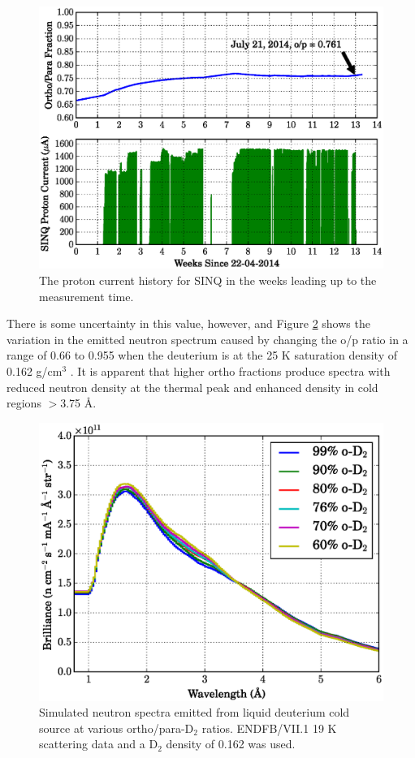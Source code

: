 \documentclass[5p,12pt]{elsarticle}
\begin{document}
\begin{figure}[h!] 
  \centering
    \includegraphics[width=\columnwidth]{graphics/p_current.eps}
     \caption{The proton current history for SINQ in the weeks leading up to the measurement time. \label{fig:p_current}}
\end{figure}

There is some uncertainty in this value, however, and Figure \ref{fig:op_compare} shows the variation in the emitted neutron spectrum caused by changing the o/p ratio in a range of 0.66 to 0.955 when the deuterium is at the 25 K saturation density of 0.162 g/cm$^3$ \cite{bnl_cryo}.  It is apparent that higher ortho fractions produce spectra with reduced neutron density at the thermal peak and enhanced density in cold regions $>$3.75 {\AA}.

\begin{figure}[h!] 
  \centering
    \includegraphics[width=\columnwidth]{graphics/op_compare.eps}
     \caption{Simulated neutron spectra emitted from liquid deuterium cold source at various ortho/para-D$_2$ ratios. ENDFB/VII.1 19 K scattering data and a D$_2$ density of 0.162 was used.   \label{fig:op_compare}}
\end{figure}
\end{document}
